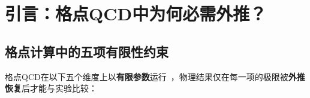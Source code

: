 \documentclass[12pt,a4paper]{ctexart}
\theoremstyle{definition}
\begin{document}
\begin{abstract}
\textbf{第四层——无穷大动量外推（$P_z\to\infty$）（§5）：}
在LaMET框架中，准PDF $\tilde q(x,P_z)$仅在$P_z\to\infty$极限下才等价于光锥PDF $q(x,\mu)$。有限$P_z$导致两类系统误差：(a) 幂次修正$\sim \Lambda_{\text{QCD}}^2/[x^2(1-x)P_z^2]$——在小$x$和大$x$两端被增强，在中等$x$区域（$x\sim 0.3\text{--}0.6$）较温和；(b) 匹配核中的大对数$\ln(\mu^2/(2xP_z)^2)$——通过RGR重求和系统处理。外推形式通常使用$f(x,P_z) = f_0(x) + c(x)/P_z^2 + d(x)/P_z^4 + \cdots$——在至少3个$P_z$值下的数据外推到$1/P_z^2\to 0$。以CLQCD/LPC合作组的胶子PDF连续极限计算和LPC合作组的核子横向性PDF计算为例，讨论仅用单$P_z$和用多个$P_z$外推的系统误差差异。

\textbf{第五层——联合外推（多维度同时外推）（§6）：}
实际的格点PDF计算通常在单计算中同时依赖$a$、$1/P_z$和$m_\pi$三个参数。将这些``裸''结果外推到物理极限的最稳健方式是\textbf{联合（simultaneous）外推}——即在一个统一的拟合公式中同时处理所有维度的外推。以横向性PDF的联合外推公式\cite{NucleonTransversity2024}为例：
\begin{equation*}
h(x, P_z, a, m_\pi) = h_0(x) + a^2 F(x) + \frac{D(x)}{P_z^2} + g_0 m_\pi^2 \ln\frac{m_\pi^2}{\mu_0^2} + \cdots
\end{equation*}
以及CLQCD/LPC胶子PDF的外推形式\cite{Chen2025gluon}：
\begin{equation*}
xg(x, P_z, a) = xg_0(x) + a^2 f(x) + a^2 P_z^2 h(x) + \frac{d(x)}{P_z^2}.
\end{equation*}
讨论各项的物理来源、$a^2 P_z^2$项的必要性（动量依赖的离散化误差）、以及使用不同格距/动量/质量组合的系综时应遵循的策略。最后以横向性PDF \cite{NucleonTransversity2024}的六系综联合外推和胶子PDF \cite{Chen2025gluon}的三格距联合外推为实例，展示完整的联合外推从数据到物理结果的完整流程。
\end{abstract}

\tableofcontents
\newpage

\section{引言：格点QCD中为何必需外推？}

\subsection{格点计算中的五项有限性约束}

格点QCD在以下五个维度上以\textbf{有限参数}运行~\cite{GattringerLang2010,Gupta1997intro}，物理结果仅在每一项的极限被\textbf{外推恢复}后才能与实验比较：
\end{document}
